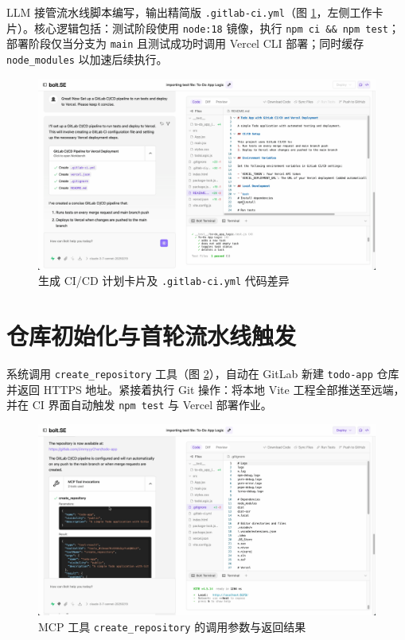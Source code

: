 LLM 接管流水线脚本编写，输出精简版 \texttt{.gitlab-ci.yml}（图 \ref{fig:ci_plan}，左侧工作卡片）。核心逻辑包括：测试阶段使用 \texttt{node:18} 镜像，执行 \texttt{npm ci \&\& npm test}；部署阶段仅当分支为 \texttt{main} 且测试成功时调用 Vercel CLI 部署；同时缓存 \texttt{node\_modules} 以加速后续执行。

\begin{figure}[H]
  \centering
  \includegraphics[width=\textwidth]{figures/screenshots/ci-cd/ci_plan.png}
  \caption{生成 CI/CD 计划卡片及 \texttt{.gitlab-ci.yml} 代码差异}
  \label{fig:ci_plan}
\end{figure}

\section{仓库初始化与首轮流水线触发}

系统调用 \texttt{create\_repository} 工具（图 \ref{fig:mcp_invocation}），自动在 GitLab 新建 \texttt{todo-app} 仓库并返回 HTTPS 地址。紧接着执行 Git 操作：将本地 Vite 工程全部推送至远端，并在 CI 界面自动触发 \texttt{npm test} 与 Vercel 部署作业。

\begin{figure}[H]
  \centering
  \includegraphics[width=\textwidth]{figures/screenshots/ci-cd/mcp_invocation.png}
  \caption{MCP 工具 \texttt{create\_repository} 的调用参数与返回结果}
  \label{fig:mcp_invocation}
\end{figure}


